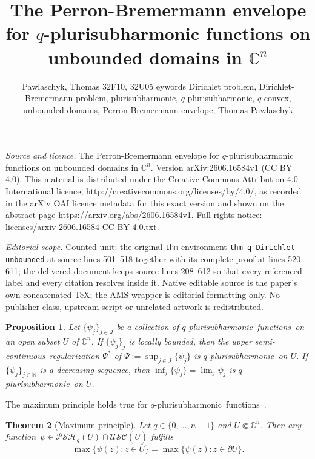 \documentclass[10pt,a4paper]{amsart}
\newtheorem{thm}{Theorem}[section]
\newtheorem{prop}[thm]{Proposition}
\numberwithin{equation}{section}
\newcommand{\nbb}{\mathbb{N}}
\newcommand{\cbb}{\mathbb{C}}
\newcommand{\USC}{\mathcal{USC}}
\newcommand{\qpsh}{$q$-pluri\-sub\-harmonic}
\newcommand{\PSH}{\mathcal{PSH}}
\newcommand{\cl}[1]{\overline{#1}}
\newcommand{\usc}{upper semi-continuous}
\newcommand{\fct}{function}
\newcommand{\fcts}{functions}
\newcommand{\relc}{\Subset}
\begin{document}
\title[The Perron-Bremermann envelope for q-plurisubharmonic functi]{The Perron-Bremermann envelope for $q$-plurisubharmonic functions on unbounded domains in $\mathbb{C}^n$}
\author{Pawlaschyk, Thomas 32F10, 32U05 ęywords Dirichlet problem, Dirichlet-Bremermann problem, plurisubharmonic, $q$-plurisubharmonic, $q$-convex, unbounded domains, Perron-Bremermann envelope; Thomas Pawlaschyk}
\date{}
\maketitle
\noindent\emph{Source and licence.} The Perron-Bremermann envelope for $q$-plurisubharmonic functions on unbounded domains in $\mathbb{C}^n$. Version arXiv:2606.16584v1 (CC BY 4.0). This material is distributed under the Creative Commons Attribution 4.0 International licence, http://creativecommons.org/licenses/by/4.0/, as recorded in the arXiv OAI licence metadata for this exact version and shown on the abstract page https://arxiv.org/abs/2606.16584v1. Full rights notice: licenses/arxiv-2606.16584-CC-BY-4.0.txt.\par\smallskip
\noindent\textit{Editorial scope.} Counted unit: the original \texttt{thm} environment \texttt{thm-q-Dirichlet-unbounded} at source lines 501--518 together with its complete proof at lines 520--611; the delivered document keeps source lines 208--612 so that every referenced label and every citation resolves inside it. Native editable source is the paper's own concatenated TeX; the AMS wrapper is editorial formatting only. No publisher class, upstream script or unrelated artwork is redistributed.
\begin{prop}\label{prop-sup-inf-qpsh} Let $\{\psi_j\}_{j \in J}$ be a collection of \qpsh\ \fcts\ on an open subset $U$ of $\cbb^n$. If $\{\psi_j\}_j$ is locally bounded, then the \usc\ regularization $\Psi^*$ of $\Psi:=\sup_{j \in J}\{\psi_j\}$ is \qpsh\ on $U$. If $\{\psi_j\}_{j \in \nbb}$ is a decreasing sequence, then $\inf_j\{\psi_j\}=\lim_j \psi_j$ is \qpsh\ on $U$.
\end{prop}

The maximum principle holds true for \qpsh\ \fcts~\cite{HM}.

\begin{thm}[Maximum principle] \label{prop-qpsh-locmax} Let $q\in\{ 0,\ldots,n-1\}$ and $U \relc \cbb^n$. Then any \fct\ $\psi \in \PSH_q(U) \cap \USC(\cl{U})$ fulfills
\[
\max\{ \psi(z) : z \in \cl{U}\} = \max\{\psi(z) : z \in \partial U\}.
\]
\end{thm}
\end{document}

